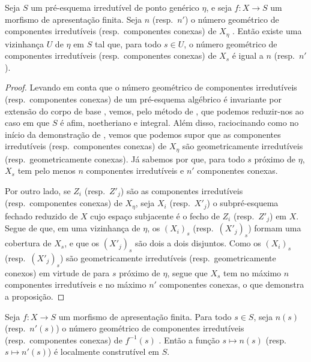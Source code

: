 \begin{proposition}[9.7.8]
\label{IV.9.7.8}
Seja $S$ um pré-esquema irredutível de ponto genérico $\eta$, e seja $f:X\to S$ um morfismo de apresentação finita. Seja $n$ (resp.\ $n'$) o número geométrico de componentes irredutíveis (resp.\ componentes conexas) de $X_\eta$ . Então existe uma vizinhança $U$ de $\eta$ em $S$ tal que, para todo $s\in U$, o número geométrico de componentes irredutíveis (resp.\ componentes conexas) de $X_s$ é igual a $n$ (resp.\ $n'$).
\end{proposition}

\begin{proof}
Levando em conta que o número geométrico de componentes irredutíveis (resp.\ componentes conexas) de um pré-esquema algébrico é invariante por extensão do corpo de base , vemos, pelo método de , que podemos reduzir-nos ao caso em que $S$ é afim, noetheriano e integral. Além disso, raciocinando como no início da demonstração de , vemos que podemos supor que as componentes irredutíveis (resp.\ componentes conexas) de $X_\eta$ são geometricamente irredutíveis (resp.\ geometricamente conexas). Já sabemos por  que, para todo $s$ próximo de $\eta$, $X_s$ tem pelo menos $n$ componentes irredutíveis e $n'$ componentes conexas.

Por outro lado, se $Z_i$ (resp.\ $Z'_j$) são as componentes irredutíveis (resp.\ componentes conexas) de $X_\eta$, seja $X_i$ (resp.\ $X'_j$) o subpré-esquema fechado reduzido de $X$ cujo espaço subjacente é o fecho de $Z_i$ (resp.\ $Z'_j$) em $X$. Segue de  que, em uma vizinhança de $\eta$, os $(X_i)_s$ (resp.\ $(X'_j)_s$) formam uma cobertura de $X_s$, e que os $(X'_j)_s$ são dois a dois disjuntos. Como os $(X_i)_s$ (resp.\ $(X'_j)_s$) são geometricamente irredutíveis (resp.\ geometricamente conexos) em virtude de  para $s$ próximo de $\eta$, segue que $X_s$ tem no máximo $n$ componentes irredutíveis e no máximo $n'$ componentes conexas, o que demonstra a proposição.
\end{proof}

\begin{corollary}[9.7.9]
\label{IV.9.7.9}
Seja $f:X\to S$ um morfismo de apresentação finita. Para todo $s\in S$, seja $n(s)$ (resp.\ $n'(s)$) o número geométrico de componentes irredutíveis (resp.\ componentes conexas) de $f^{-1}(s)$ . Então a função $s\mapsto n(s)$ (resp.\ $s\mapsto n'(s)$) é localmente construtível em $S$.
\end{corollary}

